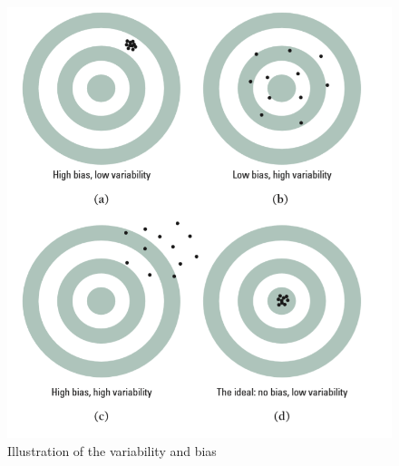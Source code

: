 \documentclass[a4paper, 12pt,twoside]{book}
\begin{document}
    \begin{figure}[H]
         \centering
         \includegraphics[scale=0.4]{VariabilityAndBias}
         \caption{Illustration of the variability and bias}
         \label{VariabilityAndBias}
    \end{figure}
\newpage
\end{document}
